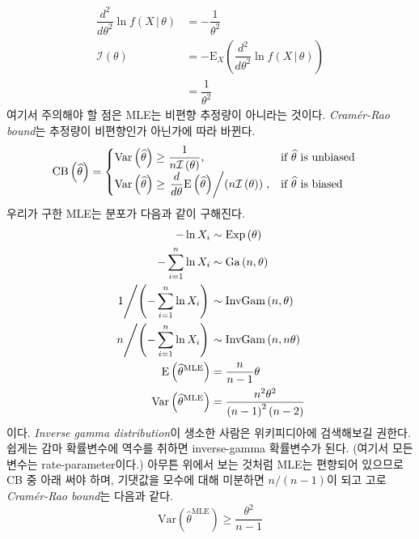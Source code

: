 \documentclass[answers]{exam}
\begin{document}
\begin{questions}
\begin{solution}
\begin{enumerate}[(a)]
\begin{align}
    			\dfrac{d^{2}}{d\theta^{2}}\ln f\left(X\,|\,\theta\right) &= -\dfrac{1}{\theta^{2}}\\
    			\mathcal{I}\left(\theta\right) &= -\mathrm{E}_{X}\left(\dfrac{d^{2}}{d\theta^{2}}\ln f\left(X\,|\,\theta\right)\right) \\
    			&= \dfrac{1}{\theta^{2}}
    		\end{align}
    		여기서 주의해야 할 점은 MLE는 비편향 추정량이 아니라는 것이다. \emph{Cramér-Rao bound}는 추정량이 비편향인가 아닌가에 따라 바뀐다.
    		\begin{align}
    			\mathrm{CB}\left(\widehat{\theta}\right) &= \begin{cases}\mathrm{Var}\left(\widehat{\theta}\right)\geq \dfrac{1}{n\mathcal{I}\left(\theta\right)},&\text{if $\widehat{\theta}$ is unbiased}\\\mathrm{Var}\left(\widehat{\theta}\right)\geq \left.\dfrac{d}{d\theta}\mathrm{E}\left(\widehat{\theta}\right)\middle/\left(n\mathcal{I}\left(\theta\right)\right)\right.,& \text{if $\widehat{\theta}$ is biased}\end{cases}
    		\end{align}
    		우리가 구한 MLE는 분포가 다음과 같이 구해진다.
    		\begin{align}
    			-\ln X_{i} &\sim \mathrm{Exp}\left(\theta\right)\\
    			-\sum_{i=1}^{n}\ln X_{i} &\sim \mathrm{Ga}\left(n,\theta\right)\\
    			\left.1\middle/\left(-\sum_{i=1}^{n}\ln X_{i}\right)\right. &\sim \mathrm{InvGam}\left(n,\theta\right)\\
    			\left.n\middle/\left(-\sum_{i=1}^{n}\ln X_{i}\right)\right. &\sim \mathrm{InvGam}\left(n,n\theta\right)\\
    			\mathrm{E}\left(\widehat{\theta}^{\text{MLE}}\right) &= \dfrac{n}{n-1}\theta\\
    			\mathrm{Var}\left(\widehat{\theta}^{\text{MLE}}\right) &= \dfrac{n^{2}\theta^{2}}{\left(n-1\right)^{2}\left(n-2\right)}
    		\end{align}
    		이다. \emph{Inverse gamma distribution}이 생소한 사람은 위키피디아에 검색해보길 권한다. 쉽게는 감마 확률변수에 역수를 취하면 inverse-gamma 확률변수가 된다. (여기서 모든 변수는 rate-parameter이다.) 아무튼 위에서 보는 것처럼 MLE는 편향되어 있으므로 CB 중 아래 써야 하며, 기댓값을 모수에 대해 미분하면 $n/\left(n-1\right)$이 되고 고로 \emph{Cramér-Rao bound}는 다음과 같다.
    		\begin{equation}
    			\mathrm{Var}\left(\widehat{\theta}^{\text{MLE}}\right) \geq \dfrac{\theta^{2}}{n-1}

\end{equation}
\end{enumerate}
\end{solution}
\end{questions}
\end{document}
